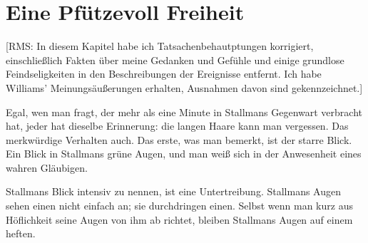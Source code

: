 \chapter{Eine Pfützevoll Freiheit}

[RMS: In diesem Kapitel habe ich Tatsachenbehautptungen korrigiert, einschließlich Fakten über meine Gedanken und Gefühle und einige grundlose Feindseligkeiten in den Beschreibungen der Ereignisse entfernt. Ich habe Williams' Meinungsäußerungen erhalten, Ausnahmen davon sind gekennzeichnet.]

Egal, wen man fragt, der mehr als eine Minute in Stallmans Gegenwart verbracht hat, jeder hat dieselbe Erinnerung: die langen Haare kann man vergessen. Das merkwürdige Verhalten auch. Das erste, was man bemerkt, ist der starre Blick. Ein Blick in Stallmans grüne Augen, und man weiß sich in der Anwesenheit eines wahren Gläubigen.

Stallmans Blick intensiv zu nennen, ist eine Untertreibung. Stallmans Augen sehen einen nicht einfach an; sie durchdringen einen. Selbst wenn man kurz aus Höflichkeit seine Augen von ihm ab richtet, bleiben Stallmans Augen auf einem heften.

